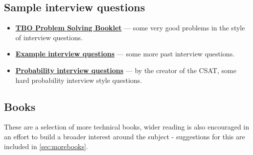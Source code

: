\documentclass[11pt]{article}
\begin{document}
\subsection{Sample interview questions}

\begin{itemize}

\item \href{https://www.drfrost.org/uploads/users/1/r261/TBO\%20Problem\%20Solving\%20Booklet.pdf}{\textbf{TBO Problem Solving Booklet}} --- some very good problems in the style of interview questions. 

\item \href{https://vg354.user.srcf.net/resources/Interview_questions.pdf}{\textbf{Example interview questions}} --- some more past interview questions.

\item \href{https://www.cl.cam.ac.uk/\string~abr28/prob/questions.pdf}{\textbf{Probability interview questions}} --- by the creator of the CSAT, some hard probability interview style questions.

\end{itemize}

\subsection{Books}

These are a selection of more technical books, wider reading is also encouraged in an effort to build a broader interest around the subject - suggestions for this are included in \cref{sec:morebooks}.
\end{document}
